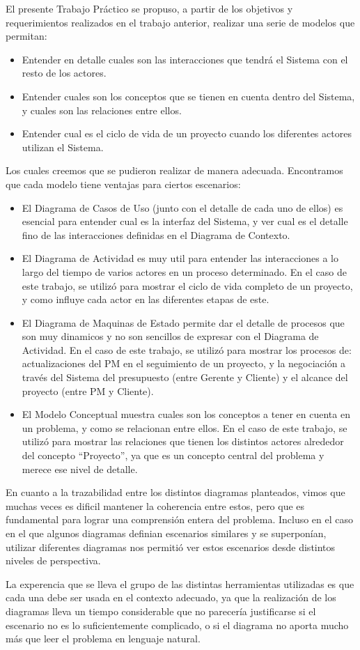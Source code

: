 El presente Trabajo Práctico se propuso, a partir de los objetivos y requerimientos realizados en el trabajo anterior, 
realizar una serie de modelos que permitan:

\begin{itemize}
	\item Entender en detalle cuales son las interacciones que tendrá el Sistema con el resto de los actores.
	\item Entender cuales son los conceptos que se tienen en cuenta dentro del Sistema, y cuales son las relaciones entre ellos.
	\item Entender cual es el ciclo de vida de un proyecto cuando los diferentes actores utilizan el Sistema.
\end{itemize}

Los cuales creemos que se pudieron realizar de manera adecuada. Encontramos que cada modelo tiene ventajas para ciertos escenarios:
\begin{itemize}
	\item El Diagrama de Casos de Uso (junto con el detalle de cada uno de ellos) es esencial para entender cual es la interfaz del Sistema, y ver cual es el detalle fino de las interacciones definidas en el Diagrama de Contexto.
	\item El Diagrama de Actividad es muy util para entender las interacciones a lo largo del tiempo de varios actores en un proceso determinado. En el caso de este trabajo, se utilizó para mostrar el ciclo de vida completo de un proyecto, y como influye cada actor en las diferentes etapas de este.
	\item El Diagrama de Maquinas de Estado permite dar el detalle de procesos que son muy dinamicos y no son sencillos de expresar con el Diagrama de Actividad. En el caso de este trabajo, se utilizó para mostrar los procesos de: actualizaciones del PM en el seguimiento de un proyecto, y la negociación a través del Sistema del presupuesto (entre Gerente y Cliente) y el alcance del proyecto (entre PM y Cliente).
	\item El Modelo Conceptual muestra cuales son los conceptos a tener en cuenta en un problema, y como se relacionan entre ellos. En el caso de este trabajo, se utilizó para mostrar las relaciones que tienen los distintos actores alrededor del concepto ``Proyecto'', ya que es un concepto central del problema y merece ese nivel de detalle.
\end{itemize}

En cuanto a la trazabilidad entre los distintos diagramas planteados, vimos que muchas veces es dificil mantener la coherencia entre estos, pero que es fundamental para lograr una comprensión entera del problema. Incluso en el caso en el que algunos diagramas definian escenarios similares y se superponían, utilizar diferentes diagramas nos permitió ver estos escenarios desde distintos niveles de perspectiva.

La experencia que se lleva el grupo de las distintas herramientas utilizadas es que cada una debe ser usada en el contexto adecuado, ya que la realización de los diagramas lleva un tiempo considerable que no parecería justificarse si el escenario no es lo suficientemente complicado, o si el diagrama no aporta mucho más que leer el problema en lenguaje natural.
